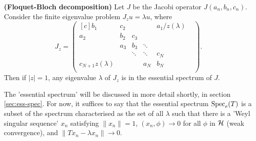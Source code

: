 \documentclass[../main.tex]{subfiles}
\begin{document}
\begin{proposition}{\textbf{(Floquet-Bloch decomposition)}}
  Let $J$ be the Jacobi operator $J(a_n, b_n, c_n)$. 
  Consider the finite eigenvalue problem $J_z u = \lambda u$, where
  \begin{equation}
  \label{eqn:floquet-bloch}
    J_z =
    \begin{pmatrix*}[c]
      b_1 & c_2 & & & a_1/z(\lambda)\\
      a_2 & b_2 & c_3 & & & \\
      & a_3 & b_3 & \ddots & & \\
      & & \ddots & \ddots & c_N & \\
      c_{N+1} z(\lambda) & & & a_N & b_N\\
    \end{pmatrix*}.
  \end{equation}
Then if $|z|=1$, any eigenvalue $\lambda$ of $J_z$
is in the essential spectrum of $J$.
\end{proposition}

The 'essential spectrum' will be discussed in more detail shortly, in section \ref{sec:ess-spec}.
For now, it suffices to say that the essential spectrum $\mathrm{Spec}_e(T)$ is a subset of the spectrum
characterised as the set of all $\lambda$ such that there is a 'Weyl singular sequence'
$x_n$ satisfying $\|x_n\| = 1$, $(x_n, \phi) \rightarrow 0$ for all $\phi$ in $\mathcal{H}$
(weak convergence), and $\|Tx_n - \lambda x_n\| \rightarrow 0$.
\end{document}
